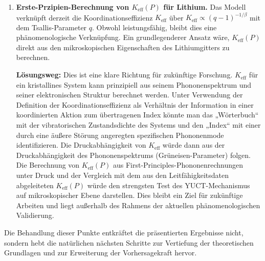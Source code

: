\documentclass[12pt,a4paper]{article}
\theoremstyle{remark}
\newcommand{\Ke}{K_{\mathrm{eff}}}
\begin{document}
\begin{enumerate}
		\textbf{Lösungsweg:} Dieser Punkt kann geklärt werden, indem man erklärt, dass \(q(P)\) kein freier Parameter von YUCT ist, sondern ein Input, der aus der gut etablierten Physik von Lithium unter Druck abgeleitet wird. Er wird durch die druckabhängige elektronische Zustandsdichte und die daraus resultierende Modifikation des Nichtextensivitätsparameters bestimmt. Diese Beziehung \(q(P)\) ist unabhängig mit Hilfe der Dichtefunktionaltheorie (DFT) berechenbar und daher keine Vorhersage von YUCT, sondern eine Randbedingung. Das YUCT-Framework nimmt dann diesen Input und sagt über das universelle Gesetz die Leitfähigkeit voraus. Um den Text rigoroser zu gestalten, können wir hinzufügen: \textit{„Die Beziehung \(q(P)\) wird aus First-Principles-DFT-Berechnungen der elektronischen Struktur von Lithium unter Druck erhalten (z.B. über die druckabhängige effektive Masse und Fermi-Oberflächentopologie), die dann zur Berechnung des Tsallis-\(q\)-Parameters gemäß der Vorschrift in \cite{Tsallis2009} verwendet wird. Ihre spezifische Form wird hier nicht abgeleitet, da sie ein wohldefinierter Input aus der Festkörperphysik ist, kein Output von YUCT. Die in Abbildung \ref{fig:fitted} gezeigte Übereinstimmung zwischen Theorie und Experiment testet daher das YUCT-Skalierungsgesetz mit einem standardmäßigen, unabhängig berechneten Input.“}
		
		\item \textbf{Erste-Przipien-Berechnung von \(\Ke(P)\) für Lithium.} Das Modell verknüpft derzeit die Koordinationseffizienz \(\Ke\) über \(\Ke \propto (q-1)^{-1/\beta}\) mit dem Tsallis-Parameter \(q\). Obwohl leistungsfähig, bleibt dies eine phänomenologische Verknüpfung. Ein grundlegenderer Ansatz wäre, \(\Ke(P)\) direkt aus den mikroskopischen Eigenschaften des Lithiumgitters zu berechnen.
		
		\textbf{Lösungsweg:} Dies ist eine klare Richtung für zukünftige Forschung. \(\Ke\) für ein kristallines System kann prinzipiell aus seinem Phononenspektrum und seiner elektronischen Struktur berechnet werden. Unter Verwendung der Definition der Koordinationseffizienz als Verhältnis der Information in einer koordinierten Aktion zum übertragenen Index könnte man das „Wörterbuch“ mit der vibratorischen Zustandsdichte des Systems und den „Index“ mit einer durch eine äußere Störung angeregten spezifischen Phononenmode identifizieren. Die Druckabhängigkeit von \(\Ke\) würde dann aus der Druckabhängigkeit des Phononenspektrums (Grüneisen-Parameter) folgen. Die Berechnung von \(\Ke(P)\) aus First-Principles-Phononenrechnungen unter Druck und der Vergleich mit dem aus den Leitfähigkeitsdaten abgeleiteten \(\Ke(P)\) würde den strengsten Test des YUCT-Mechanismus auf mikroskopischer Ebene darstellen. Dies bleibt ein Ziel für zukünftige Arbeiten und liegt außerhalb des Rahmens der aktuellen phänomenologischen Validierung.
	\end{enumerate}
	Die Behandlung dieser Punkte entkräftet die präsentierten Ergebnisse nicht, sondern hebt die natürlichen nächsten Schritte zur Vertiefung der theoretischen Grundlagen und zur Erweiterung der Vorhersagekraft hervor.
	
\end{document}
